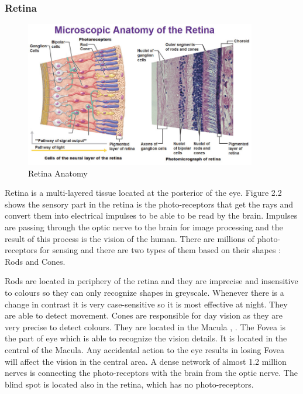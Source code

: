 \subsubsection{Retina}
\begin{figure}[htb]
        \centering
        \includegraphics[width = 0.9\textwidth]{figures/Retina.jpg} %
  \caption{Retina Anatomy \cite{retinaimage}}
  \label{fig:Retinaanatomy}
\end{figure}  
Retina is a multi-layered tissue located at the posterior of the eye.
Figure 2.2 shows the sensory part in the retina is the photo-receptors that get the rays and convert them into electrical impulses to be able to be read by the brain.
Impulses are passing through the optic nerve to the brain for image processing and the result of this process is the vision of the human.
There are millions of photo-receptors for sensing and there are two types of them based on their shapes : Rods and Cones.

Rods are located in periphery of the retina and they are imprecise and insensitive to colours so they can only recognize shapes in greyscale.
Whenever there is a change in contrast it is very case-sensitive so it is most effective at night.
They are able to detect movement.    
Cones are responsible for day vision as they are very precise to detect colours.
They are located in the Macula \cite{mccaa1982eye}, \cite{abramoff2010retinal}.
The Fovea is the part of eye which is able to recognize the vision details. It is located in the central of the Macula.
Any accidental action to the eye results in losing Fovea will affect the vision in the central area.
A dense network of almost 1.2 million nerves is connecting the photo-receptors with the brain from the optic nerve.
The blind spot is located also in the retina, which has no photo-receptors.

